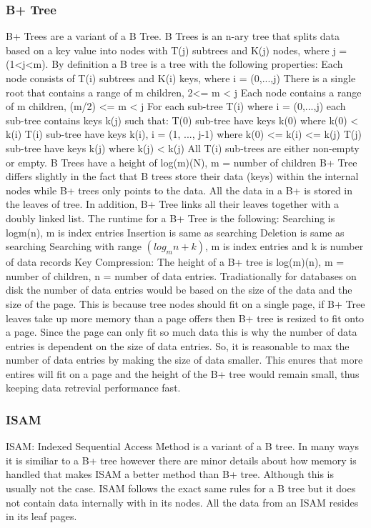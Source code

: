 \documentclass[letterpaper, 12pt]{article}
\begin{document}
\subsubsection{B+ Tree}
B+ Trees are a variant of a B Tree. B Trees is an n-ary tree that splits data
	based on a key value into nodes with T(j) subtrees and K(j) nodes, where j = (1<j<m).
	By definition a B tree is a tree with the following properties:
	Each node consists of T(i) subtrees and K(i) keys, where i = (0,...,j)
	There is a single root that contains a range of m children, 2<= m < j
	Each node contains a range of m children, (m/2) <= m < j
	For each sub-tree T(i) where i = (0,...,j) each sub-tree contains keys k(j) such that:
		T(0) sub-tree have keys k(0) where k(0) < k(i)
		T(i) sub-tree have keys k(i), i = (1, ..., j-1) where k(0) <= k(i) <= k(j)
		T(j) sub-tree have keys k(j) where k(j) < k(j)
	All T(i) sub-trees are either non-empty or empty.
	B Trees have a height of log(m)(N), m = number of children
B+ Tree differs slightly in the fact that B trees store their data (keys) within the internal nodes while
B+ trees only points to the data. All the data in a B+ is stored in the leaves of tree. In addition,
B+ Tree links all their leaves together with a doubly linked list.
The runtime for a B+ Tree is the following:
Searching is logm(n), m is index entries
Insertion is same as searching
Deletion is same as searching
Searching with range $( log_m n + k) $, m is index entries and k is number of data records
Key Compression:
The height of a B+ tree is log(m)(n), m = number of children, n = number of data entries.
Tradiationally for databases on disk the number of data entries would be based on the size of the data and
the size of the page. This is because tree nodes should fit on a single page, if B+ Tree leaves take up more
memory than a page offers then B+ tree is resized to fit onto a page. Since the page can only fit so much
data this is why the number of data entries is dependent on the size of data entries. So, it is reasonable
to max the number of data entries by making the size of data smaller. This enures that more entires will
fit on a page and the height of the B+ tree would remain small, thus keeping data retrevial performance fast.

\subsubsection{ISAM}
ISAM:
Indexed Sequential Access Method is a variant of a B tree. In many ways it is similiar to a B+ tree however there are minor details about how memory is handled
that makes ISAM a better method than B+ tree. Although this is usually not the case. ISAM follows the exact same rules for a B tree but it does not contain
data internally with in its nodes. All the data from an ISAM resides in its leaf pages.
\end{document}
